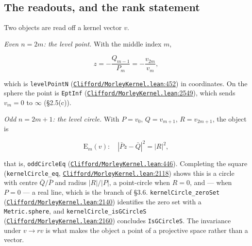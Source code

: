 \documentclass[11pt]{article}
\theoremstyle{definition}
\theoremstyle{remark}
\begin{document}
\hypertarget{the-readouts-and-the-rank-statement}{%
\subsection{The readouts, and the rank statement}\label{the-readouts-and-the-rank-statement}}

Two objects are read off a kernel vector \(v\).

\emph{Even \(n = 2m\): the level point.} With the middle index \(m\),

\[ z = -\frac{Q_{m-1}}{P_m} = -\frac{v_{2m}}{v_m}, \]

which is \texttt{levelPointN} (\href{https://github.com/jpbald93/paperl_clifford_chain/blob/e1ae145c2565cc98816635387412edc0a740c27c/Clifford/MorleyKernel.lean\#L452}{\texttt{Clifford/\allowbreak MorleyKernel.lean}:452}) in coordinates. On the sphere the point is
\texttt{EptInf} (\href{https://github.com/jpbald93/paperl_clifford_chain/blob/e1ae145c2565cc98816635387412edc0a740c27c/Clifford/MorleyKernel.lean\#L2549}{\texttt{Clifford/\allowbreak MorleyKernel.lean}:2549}), which sends \(v_m = 0\) to $\infty$ (\S{}2.5(c)).

\emph{Odd \(n = 2m+1\): the level circle.} With \(P = v_0\), \(Q = v_{m+1}\), \(R = v_{2m+1}\), the object is

\[ \mathrm{E}_m(v): \quad |\bar P z - \bar Q|^2 = |R|^2 , \]

that is, \texttt{oddCircleEq} (\href{https://github.com/jpbald93/paperl_clifford_chain/blob/e1ae145c2565cc98816635387412edc0a740c27c/Clifford/MorleyKernel.lean\#L446}{\texttt{Clifford/\allowbreak MorleyKernel.lean}:446}). Completing the square
(\texttt{kernelCircle\_\allowbreak eq}, \href{https://github.com/jpbald93/paperl_clifford_chain/blob/e1ae145c2565cc98816635387412edc0a740c27c/Clifford/MorleyKernel.lean\#L2118}{\texttt{Clifford/\allowbreak MorleyKernel.lean}:2118}) shows this is a circle with centre \(\bar Q/\bar P\)
and radius \(|R|/|P|\), a point-circle when \(R = 0\), and --- when \(P = 0\) --- a real line, which is the branch
of \S{}3.6. \texttt{kernelCircle\_\allowbreak zeroSet} (\href{https://github.com/jpbald93/paperl_clifford_chain/blob/e1ae145c2565cc98816635387412edc0a740c27c/Clifford/MorleyKernel.lean\#L2140}{\texttt{Clifford/\allowbreak MorleyKernel.lean}:2140}) identifies the zero set with a
\texttt{Metric.\allowbreak sphere}, and \texttt{kernelCircle\_\allowbreak isGCircleS} (\href{https://github.com/jpbald93/paperl_clifford_chain/blob/e1ae145c2565cc98816635387412edc0a740c27c/Clifford/MorleyKernel.lean\#L2160}{\texttt{Clifford/\allowbreak MorleyKernel.lean}:2160}) concludes
\texttt{IsGCircleS}. The invariance under \(v \to rv\) is what makes the object a point of a projective space
rather than a vector.
\end{document}
